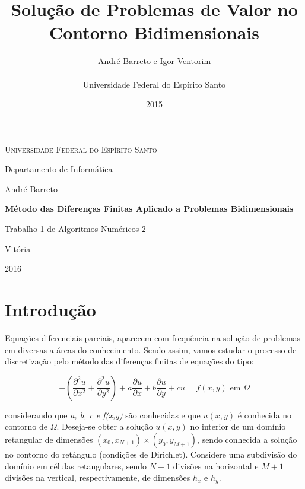 \documentclass[
	11pt,				%
	oneside,			%
	a4paper,			%
	english,			%
	brazil,				%
	]{article}
\title{\textbf{Solução de Problemas de Valor no Contorno Bidimensionais}}
\author{
André Barreto e Igor Ventorim\\\\
\normalsize Universidade Federal do Espírito Santo\\
}
\date{2015}
\begin{document}

\frenchspacing

\graphicspath{ {Imagens/} }

\begin{titlepage}
	\centering
	{\scshape \large Universidade Federal do Espírito Santo\par}
	{\large Departamento de Informática\par}
	\vspace{1cm}
	{\large André Barreto\par}
	
	\vfill
	{\LARGE \bfseries Método das Diferenças Finitas Aplicado a
Problemas Bidimensionais\par}
	\vspace{1cm}
	{\large Trabalho 1 de Algoritmos Numéricos 2\par}

	\vfill

	{\large Vitória\par}
	{\large 2016\par}
\end{titlepage}
\addtocounter{page}{1}

\section{Introdução}
Equações diferenciais parciais, aparecem com frequência na solução de problemas em diversas a áreas do conhecimento. Sendo assim, vamos estudar o processo de discretização pelo método das diferenças finitas de equações do tipo:

\begin{equation} \label{eq:1}
- \left(\frac{\partial^2 u}{\partial x^2} + \frac{\partial^2 u}{\partial y^2}\right) +
a\frac{\partial u}{\partial x} +
b\frac{\partial u}{\partial y} +
cu = f(x,y) \text{ em } \Omega
\end{equation}

\noindent considerando que \textit{a, b, c e f(x,y)} são conhecidas e que $u(x,y)$ é conhecida no contorno de $\Omega$. Deseja-se obter a solução $u(x,y)$ no interior de um domínio retangular de dimensões $(x_0,x_{N+1}) \times (y_0,y_{M+1})$, sendo conhecida a solução no contorno do retângulo (condições de Dirichlet). Considere uma subdivisão do domínio em células retangulares, sendo $N+1$ divisões na horizontal e $M+1$ divisões na vertical, respectivamente, de dimensões $h_x$ e $h_y$.
\end{document}

